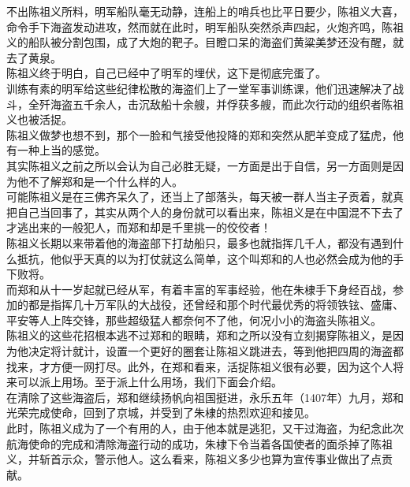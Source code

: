 \begin{multicols}{\theparacolNo}
不出陈祖义所料，明军船队毫无动静，连船上的哨兵也比平日要少，陈祖义大喜，命令手下海盗发动进攻，然而就在此时，明军船队突然杀声四起，火炮齐鸣，陈祖义的船队被分割包围，成了大炮的靶子。目瞪口呆的海盗们黄粱美梦还没有醒，就去了黄泉。\\

陈祖义终于明白，自己已经中了明军的埋伏，这下是彻底完蛋了。\\

训练有素的明军给这些纪律松散的海盗们上了一堂军事训练课，他们迅速解决了战斗，全歼海盗五千余人，击沉敌船十余艘，并俘获多艘，而此次行动的组织者陈祖义也被活捉。\\

陈祖义做梦也想不到，那个一脸和气接受他投降的郑和突然从肥羊变成了猛虎，他有一种上当的感觉。\\

其实陈祖义之前之所以会认为自己必胜无疑，一方面是出于自信，另一方面则是因为他不了解郑和是一个什么样的人。\\

可能陈祖义是在三佛齐呆久了，还当上了部落头，每天被一群人当主子贡着，就真把自己当回事了，其实从两个人的身份就可以看出来，陈祖义是在中国混不下去了才逃出来的一般犯人，而郑和却是千里挑一的佼佼者！\\

陈祖义长期以来带着他的海盗部下打劫船只，最多也就指挥几千人，都没有遇到什么抵抗，他似乎天真的以为打仗就这么简单，这个叫郑和的人也必然会成为他的手下败将。\\

而郑和从十一岁起就已经从军，有着丰富的军事经验，他在朱棣手下身经百战，参加的都是指挥几十万军队的大战役，还曾经和那个时代最优秀的将领铁铉、盛庸、平安等人上阵交锋，那些超级猛人都奈何不了他，何况小小的海盗头陈祖义。\\

陈祖义的这些花招根本逃不过郑和的眼睛，郑和之所以没有立刻揭穿陈祖义，是因为他决定将计就计，设置一个更好的圈套让陈祖义跳进去，等到他把四周的海盗都找来，才方便一网打尽。此外，在郑和看来，活捉陈祖义很有必要，因为这个人将来可以派上用场。至于派上什么用场，我们下面会介绍。\\

在清除了这些海盗后，郑和继续扬帆向祖国挺进，永乐五年（1407年）九月，郑和光荣完成使命，回到了京城，并受到了朱棣的热烈欢迎和接见。\\

此时，陈祖义成为了一个有用的人，由于他本就是逃犯，又干过海盗，为纪念此次航海使命的完成和清除海盗行动的成功，朱棣下令当着各国使者的面杀掉了陈祖义，并斩首示众，警示他人。这么看来，陈祖义多少也算为宣传事业做出了点贡献。\\


\end{multicols}
